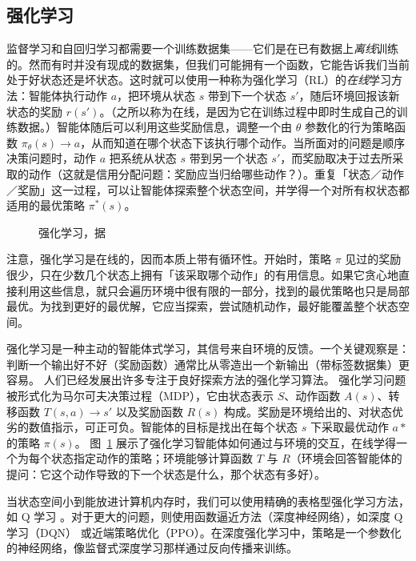 \subsection{强化学习} 
\label{sec:sdp}\label{sec:rl}
监督学习和自回归学习都需要一个训练数据集——它们是在已有数据上{\em 离线}训练的。然而有时并没有现成的数据集，但我们可能拥有一个函数，它能告诉我们当前处于好状态还是坏状态。这时就可以使用一种称为强化学习（RL）的{\em 在线}学习方法：智能体执行动作 $a$，把环境从状态 $s$ 带到下一个状态 $s'$，随后环境回报该新状态的奖励 $r(s')$。（之所以称为在线，是因为它在训练过程中即时生成自己的训练数据。）智能体随后可以利用这些奖励信息，调整一个由 $\theta$ 参数化的行为策略函数 $\pi_\theta(s) \rightarrow a$，从而知道在哪个状态下该执行哪个动作。当所面对的问题是顺序决策问题时，动作 $a$ 把系统从状态 $s$ 带到另一个状态 $s'$，而奖励取决于过去所采取的动作（这就是信用分配问题：奖励应当归给哪些动作？）。重复「状态／动作／奖励」这一过程，可以让智能体探索整个状态空间，并学得一个对所有权状态都适用的最优策略 $\pi^*(s)$。%

\begin{figure}[tb]
  \begin{center}
    
    \caption{强化学习，据 \citet{sutton2018reinforcement}}\label{fig:rl-org}
  \end{center}
\end{figure}

注意，强化学习是在线的，因而本质上带有循环性。开始时，策略 $\pi$ 见过的奖励很少，只在少数几个状态上拥有「该采取哪个动作」的有用信息。如果它贪心地直接利用这些信息，就只会遍历环境中很有限的一部分，找到的最优策略也只是局部最优。为找到更好的最优解，它应当探索，尝试随机动作，最好能覆盖整个状态空间。

强化学习是一种主动的智能体式学习，其信号来自环境的反馈。一个关键观察是：判断一个输出好不好（奖励函数）通常比从零造出一个新输出（带标签数据集）更容易。
人们已经发展出许多专注于良好探索方法的强化学习算法。
强化学习问题被形式化为马尔可夫决策过程（MDP），它由状态表示 $S$、动作函数 $A(s)$、转移函数 $T(s, a) \rightarrow s'$ 以及奖励函数 $R(s)$ 构成。奖励是环境给出的、对状态优劣的数值指示，可正可负。智能体的目标是找出在每个状态 $s$ 下采取最优动作 $a*$ 的策略 $\pi(s)$。
图~\ref{fig:rl-org} 展示了强化学习智能体如何通过与环境的交互，在线学得一个为每个状态指定动作的策略；环境能够计算函数 $T$ 与 $R$（环境会回答智能体的提问：它这个动作导致的下一个状态是什么，那个状态有多好）。

当状态空间小到能放进计算机内存时，我们可以使用精确的表格型强化学习方法，如 Q 学习 \citep{watkins1992q}。对于更大的问题，则使用函数逼近方法（深度神经网络），如深度 Q 学习（DQN）\citep{mnih2015human} 或近端策略优化（PPO）\citep{schulman2017proximal}。在深度强化学习中，策略是一个参数化的神经网络，像监督式深度学习那样通过反向传播来训练。

